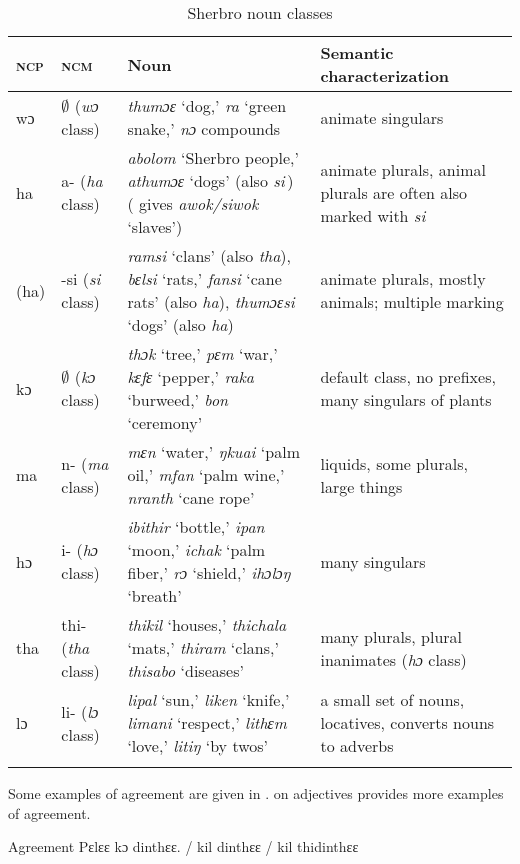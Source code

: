 \begin{table}
\caption{Sherbro noun classes}
\label{tab:wordcat:13}
\small
\begin{tabularx}{\textwidth}{llQQ}
\lsptoprule
\textsc{ncp} & \textsc{ncm} & Noun & Semantic characterization\\
\midrule
 wɔ & $\emptyset$ (\textit{wɔ} class) & \textit{thumɔɛ} ‘dog,' \textit{ra} ‘green snake,' \textit{nɔ} compounds & animate singulars\\
 ha & a- (\textit{ha} class) & \textit{abolom} ‘Sherbro people,' \textit{athumɔɛ} ‘dogs' (also \textit{si}\,) (\citet{Sumner1921} gives \textit{awok/siwok} ‘slaves') & animate plurals, animal plurals are often also marked with \textit{si}\\
 (ha) & {}-si (\textit{si} class) & \textit{ramsi} ‘clans' (also \textit{tha}), \textit{bɛlsi} ‘rats,' \textit{fansi} ‘cane rats' (also \textit{ha}), \textit{thumɔɛsi} ‘dogs' (also \textit{ha}) & animate plurals, mostly animals; multiple marking\\
 kɔ & $\emptyset$ (\textit{kɔ} class) & \textit{thɔk} ‘tree,' \textit{pɛm} ‘war,' \textit{kɛfɛ} ‘pepper,' \textit{raka} ‘burweed,' \textit{bon} ‘ceremony' & default class, no prefixes, many singulars of plants\\
 ma & n- (\textit{ma} class) & \textit{mɛn} ‘water,' \textit{ŋkuai} ‘palm oil,' \textit{mfan} ‘palm wine,' \textit{nranth} ‘cane rope' & liquids, some plurals, large things\\
 hɔ & i- (\textit{hɔ} class) & \textit{ibithir} ‘bottle,' \textit{ipan} ‘moon,' \textit{ichak} ‘palm fiber,' \textit{rɔ} ‘shield,' \textit{ihɔlɔŋ} ‘breath' & many singulars\\
 tha & thi- (\textit{tha} class) & \textit{thikil} ‘houses,' \textit{thichala} ‘mats,' \textit{thiram} ‘clans,' \textit{thisabo} ‘diseases' & many plurals, plural inanimates (\textit{hɔ} class)\\
 lɔ & li- (\textit{lɔ} class) & \textit{lipal} ‘sun,' \textit{liken} ‘knife,' \textit{limani} ‘respect,' \textit{lithɛm} ‘love,' \textit{litiŋ} ‘by twos' & a small set of nouns, locatives, converts nouns to adverbs\\
\lspbottomrule
\end{tabularx}
\end{table}

Some examples of agreement are given in .  on adjectives provides more examples of agreement.

\ea%
    \label{ex:46}
    Agreement
    \ea Pɛlɛɛ kɔ dinthɛɛ. / kil dinthɛɛ / kil thidinthɛɛ

